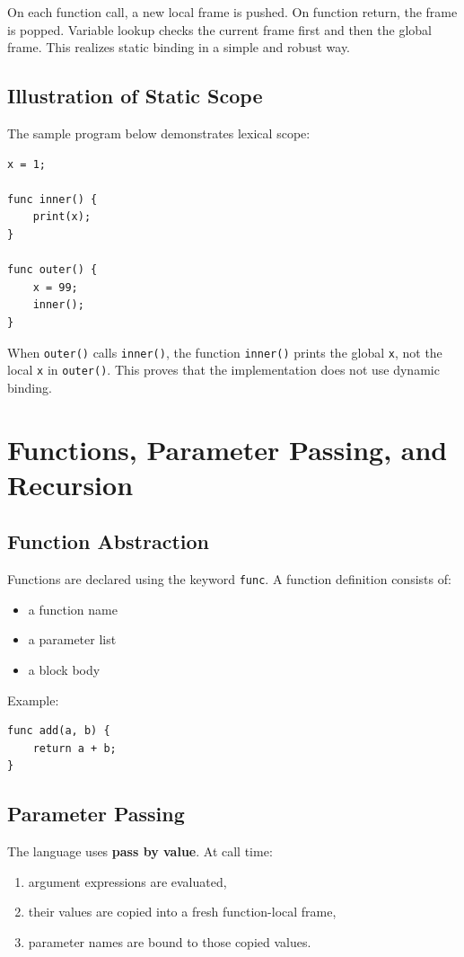 \documentclass[12pt,a4paper]{article}
\begin{document}
On each function call, a new local frame is pushed. On function return, the frame is popped. Variable lookup checks the current frame first and then the global frame. This realizes static binding in a simple and robust way.

\subsection{Illustration of Static Scope}
The sample program below demonstrates lexical scope:

\begin{lstlisting}
x = 1;

func inner() {
    print(x);
}

func outer() {
    x = 99;
    inner();
}
\end{lstlisting}

When \texttt{outer()} calls \texttt{inner()}, the function \texttt{inner()} prints the global \texttt{x}, not the local \texttt{x} in \texttt{outer()}. This proves that the implementation does not use dynamic binding.

\section{Functions, Parameter Passing, and Recursion}
\subsection{Function Abstraction}
Functions are declared using the keyword \texttt{func}. A function definition consists of:

\begin{itemize}[leftmargin=1.0cm]
    \item a function name
    \item a parameter list
    \item a block body
\end{itemize}

Example:
\begin{lstlisting}
func add(a, b) {
    return a + b;
}
\end{lstlisting}

\subsection{Parameter Passing}
The language uses \textbf{pass by value}. At call time:

\begin{enumerate}[leftmargin=1.2cm]
    \item argument expressions are evaluated,
    \item their values are copied into a fresh function-local frame,
    \item parameter names are bound to those copied values.
\end{enumerate}
\end{document}
